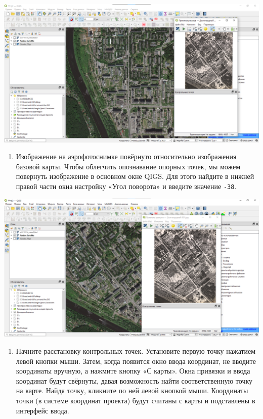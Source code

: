 \documentclass[
  12pt,
]{book}
\providecommand{\tightlist}{%
  \setlength{\itemsep}{0pt}\setlength{\parskip}{0pt}}
\begin{document}
\includegraphics{images/Ex05_Reference/RasterReference6.png}

\begin{enumerate}
\def\labelenumi{\arabic{enumi}.}
\setcounter{enumi}{4}
\tightlist
\item
  Изображение на аэрофотоснимке повёрнуто относительно изображения базовой карты. Чтобы облегчить опознавание опорных точек, мы можем повернуть изображение в основном окне QIGS. Для этого найдите в нижней правой части окна настройку «Угол поворота» и введите значение \texttt{-38}.
\end{enumerate}

\includegraphics{images/Ex05_Reference/RasterReference7.png}

\begin{enumerate}
\def\labelenumi{\arabic{enumi}.}
\setcounter{enumi}{5}
\tightlist
\item
  Начните расстановку контрольных точек. Установите первую точку нажатием левой кнопки мыши. Затем, когда появится окно ввода координат, не вводите координаты вручную, а нажмите кнопку «С карты». Окна привязки и ввода координат будут свёрнуты, давая возможность найти соответственную точку на карте. Найдя точку, кликните по ней левой кнопкой мыши. Координаты точки (в системе координат проекта) будут считаны с карты и подставлены в интерфейс ввода.
\end{enumerate}
\end{document}
